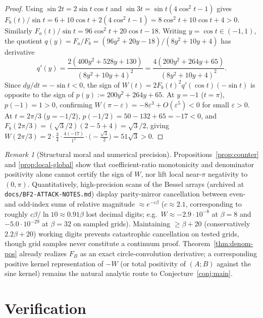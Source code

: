 \documentclass[11pt]{article}
\theoremstyle{remark}
\newtheorem{remark}[theorem]{Remark}
\begin{document}
\begin{proof}
Using $\sin 2t = 2\sin t\cos t$ and $\sin 3t = \sin t(4\cos^2 t - 1)$ gives
$F_b(t)/\sin t = 6 + 10\cos t + 2(4\cos^2 t - 1) = 8\cos^2 t + 10\cos t + 4 > 0$.
Similarly $F_a(t)/\sin t = 96\cos^2 t + 20\cos t - 18$. Writing $y = \cos t \in (-1,1)$,
the quotient $q(y) = F_a/F_b = (96y^2 + 20y - 18)/(8y^2 + 10y + 4)$ has derivative
\[
q'(y) = \frac{2(400 y^2 + 528 y + 130)}{(8y^2 + 10y + 4)^2}
= \frac{4(200 y^2 + 264 y + 65)}{(8y^2 + 10y + 4)^2}.
\]
Since $dy/dt = -\sin t < 0$, the sign of $W(t) = 2 F_b(t)^2 q'(\cos t)(-\sin t)$ is
opposite to the sign of $p(y) := 200 y^2 + 264 y + 65$. At $y = -1$ ($t = \pi$),
$p(-1) = 1 > 0$, confirming $W(\pi-\varepsilon) = -8\varepsilon^3 + O(\varepsilon^5) < 0$
for small $\varepsilon > 0$. At $t = 2\pi/3$ ($y = -1/2$), $p(-1/2) = 50 - 132 + 65 = -17 < 0$,
and $F_b(2\pi/3) = (\sqrt{3}/2)(2-5+4) = \sqrt{3}/2$, giving
$W(2\pi/3) = 2\cdot\frac{3}{4}\cdot\frac{4(-17)}{1^2}\cdot\bigl(-\frac{\sqrt{3}}{2}\bigr)
= 51\sqrt{3} > 0$.
\end{proof}

\begin{remark}[Structural moral and numerical precision]
\label{rem:moral}
Propositions~\ref{prop:counter} and \ref{prop:local-global} show that coefficient-ratio
monotonicity and denominator positivity alone cannot certify the sign of $W$, nor lift
local near-$\pi$ negativity to $(0,\pi)$. Quantitatively, high-precision scans of the
Bessel arrays (archived at \texttt{docs/BF2-ATTACK-NOTES.md}) display parity-mirror
cancellation between even- and odd-index sums of relative magnitude $\approx e^{-c\beta}$
($c \approx 2.1$, corresponding to roughly $c\beta/\ln 10 \approx 0.91\beta$ lost decimal
digits; e.g.\ $W \approx -2.9\cdot 10^{-8}$ at $\beta=8$ and $-5.0\cdot 10^{-29}$ at
$\beta=32$ on sampled grids). Maintaining $\ge \beta + 20$ (conservatively $2.2\beta+20$)
working digits prevents catastrophic cancellation on tested grids, though grid samples
never constitute a continuum proof. Theorem~\ref{thm:denom-pos} already realizes $F_B$ as
an exact circle-convolution derivative; a corresponding positive kernel representation of
$-W$ (or total positivity of $(A;B)$ against the sine kernel) remains the natural
analytic route to Conjecture~\ref{conj:main}.
\end{remark}

\section{Verification}
\end{document}
